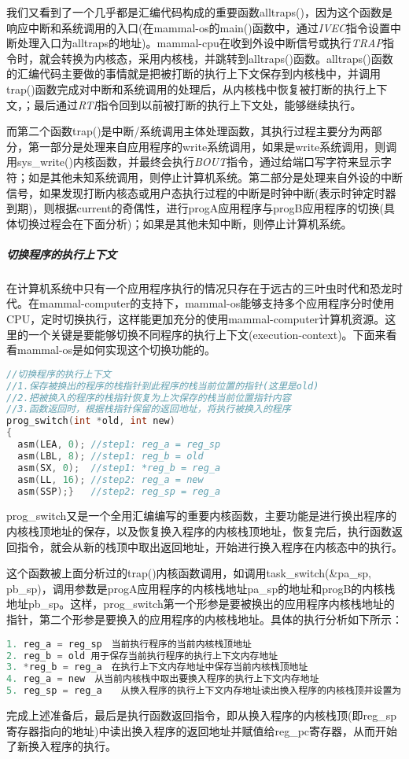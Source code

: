 我们又看到了一个几乎都是汇编代码构成的重要函数alltraps()，因为这个函数是响应中断和系统调用的入口(在mammal-os的main()函数中，通过\textit{IVEC}指令设置中断处理入口为alltraps的地址)。mammal-cpu在收到外设中断信号或执行\textit{TRAP}指令时，就会转换为内核态，采用内核栈，并跳转到alltraps()函数。alltraps()函数的汇编代码主要做的事情就是把被打断的执行上下文保存到内核栈中，并调用trap()函数完成对中断和系统调用的处理后，从内核栈中恢复被打断的执行上下文，；最后通过\textit{RTI}指令回到以前被打断的执行上下文处，能够继续执行。

而第二个函数trap()是中断/系统调用主体处理函数，其执行过程主要分为两部分，第一部分是处理来自应用程序的write系统调用，如果是write系统调用，则调用sys\_write()内核函数，并最终会执行\textit{BOUT}指令，通过给端口写字符来显示字符；如是其他未知系统调用，则停止计算机系统。第二部分是处理来自外设的中断信号，如果发现打断内核态或用户态执行过程的中断是时钟中断(表示时钟定时器到期)，则根据current的奇偶性，进行progA应用程序与progB应用程序的切换(具体切换过程会在下面分析)；如果是其他未知中断，则停止计算机系统。

\subparagraph{切换程序的执行上下文}
在计算机系统中只有一个应用程序执行的情况只存在于远古的三叶虫时代和恐龙时代。在mammal-computer的支持下，mammal-os能够支持多个应用程序分时使用CPU，定时切换执行，这样能更加充分的使用mammal-computer计算机资源。这里的一个关键是要能够切换不同程序的执行上下文(execution-context)。下面来看看mammal-os是如何实现这个切换功能的。

\begin{lstlisting}[language={C}]
//切换程序的执行上下文
//1.保存被换出的程序的栈指针到此程序的栈当前位置的指针(这里是old)
//2.把被换入的程序的栈指针恢复为上次保存的栈当前位置指针内容
//3.函数返回时，根据栈指针保留的返回地址，将执行被换入的程序
prog_switch(int *old, int new) 
{
  asm(LEA, 0); //step1: reg_a = reg_sp　　
  asm(LBL, 8); //step1: reg_b = old
  asm(SX, 0);  //step1: *reg_b = reg_a
  asm(LL, 16); //step2: reg_a = new
  asm(SSP);}   //step2: reg_sp = reg_a
\end{lstlisting}
 
prog\_switch又是一个全用汇编编写的重要内核函数，主要功能是进行换出程序的内核栈顶地址的保存，以及恢复换入程序的内核栈顶地址，恢复完后，执行函数返回指令，就会从新的栈顶中取出返回地址，开始进行换入程序在内核态中的执行。

这个函数被上面分析过的trap()内核函数调用，如调用task\_switch(\&pa\_sp, pb\_sp)，调用参数是progA应用程序的内核栈地址pa\_sp的地址和progB的内核栈地址pb\_sp。这样，prog\_switch第一个形参是要被换出的应用程序内核栈地址的指针，第二个形参是要换入的应用程序的内核栈地址。具体的执行分析如下所示：
\begin{lstlisting}[language={C}]
1. reg_a = reg_sp　当前执行程序的当前内核栈顶地址
2. reg_b = old 用于保存当前执行程序的执行上下文内存地址
3. *reg_b = reg_a　在执行上下文内存地址中保存当前内核栈顶地址
4. reg_a = new　从当前内核栈中取出要换入程序的执行上下文内存地址
5. reg_sp = reg_a　　从换入程序的执行上下文内存地址读出换入程序的内核栈顶并设置为reg\_sp
\end{lstlisting}

完成上述准备后，最后是执行函数返回指令，即从换入程序的内核栈顶(即reg\_sp寄存器指向的地址)中读出换入程序的返回地址并赋值给reg\_pc寄存器，从而开始了新换入程序的执行。


